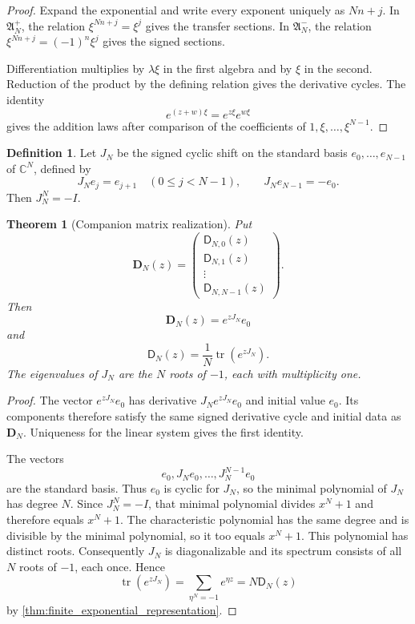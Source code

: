 \documentclass[11pt]{article}
\newtheorem{theorem}{Theorem}[section]
\theoremstyle{definition}
\newtheorem{definition}[definition]{Definition}
\theoremstyle{remark}
\newcommand{\CC}{\mathbb C}
\newcommand{\Dfun}{\mathsf D}
\newcommand{\tr}{\operatorname{tr}}
\begin{document}
\begin{proof}
Expand the exponential and write every exponent uniquely as $Nn+j$.  In $\mathfrak A_N^+$, the relation $\xi^{Nn+j}=\xi^j$ gives the transfer sections.  In $\mathfrak A_N^-$, the relation $\xi^{Nn+j}=(-1)^n\xi^j$ gives the signed sections.

Differentiation multiplies by $\lambda\xi$ in the first algebra and by $\xi$ in the second.  Reduction of the product by the defining relation gives the derivative cycles.  The identity
\[
e^{(z+w)\xi}=e^{z\xi}e^{w\xi}
\]
gives the addition laws after comparison of the coefficients of $1,\xi,\ldots,\xi^{N-1}$.
\end{proof}

\begin{definition}\label{def:signed_shift_matrix}
Let $J_N$ be the signed cyclic shift on the standard basis $e_0,\ldots,e_{N-1}$ of $\CC^N$, defined by
\[
J_Ne_j=e_{j+1}
\quad (0\leq j<N-1),
\qquad
J_Ne_{N-1}=-e_0.
\]
Then $J_N^N=-I$.
\end{definition}

\begin{theorem}[Companion matrix realization]\label{thm:companion_matrix_realization}
Put
\[
\mathbf D_N(z)
=
\begin{pmatrix}
\Dfun_{N,0}(z)\\
\Dfun_{N,1}(z)\\
\vdots\\
\Dfun_{N,N-1}(z)
\end{pmatrix}.
\]
Then
\[
\mathbf D_N(z)=e^{zJ_N}e_0
\]
and
\[
\Dfun_N(z)=\frac1N\tr(e^{zJ_N}).
\]
The eigenvalues of $J_N$ are the $N$ roots of $-1$, each with multiplicity one.
\end{theorem}

\begin{proof}
The vector $e^{zJ_N}e_0$ has derivative $J_Ne^{zJ_N}e_0$ and initial value $e_0$.  Its components therefore satisfy the same signed derivative cycle and initial data as $\mathbf D_N$.  Uniqueness for the linear system gives the first identity.

The vectors
\[
e_0,J_Ne_0,\ldots,J_N^{N-1}e_0
\]
are the standard basis.  Thus $e_0$ is cyclic for $J_N$, so the
minimal polynomial of $J_N$ has degree $N$.  Since $J_N^N=-I$, that
minimal polynomial divides $x^N+1$ and therefore equals $x^N+1$.
The characteristic polynomial has the same degree and is divisible
by the minimal polynomial, so it too equals $x^N+1$.  This polynomial
has distinct roots.  Consequently $J_N$ is diagonalizable and its
spectrum consists of all $N$ roots of $-1$, each once.  Hence
\[
\tr(e^{zJ_N})
=
\sum_{\eta^N=-1}e^{\eta z}
=
N\Dfun_N(z)
\]
by \cref{thm:finite_exponential_representation}.
\end{proof}
\end{document}
